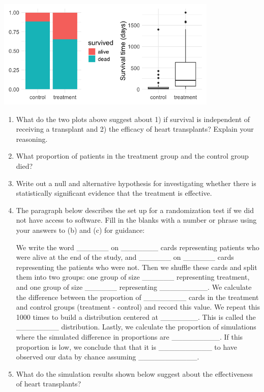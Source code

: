 \documentclass[
  letterpaper,
  DIV=11,
  numbers=noendperiod]{scrartcl}
\begin{document}
\begin{enumerate}
  \includegraphics[width=4.14583in,height=\textheight]{images/14-heart-transplant-eda.png}

  \begin{enumerate}
  \def\labelenumii{\alph{enumii}.}
  \item
    What do the two plots above suggest about 1) if survival is
    independent of receiving a transplant and 2) the efficacy of heart
    transplants? Explain your reasoning.
  \item
    What proportion of patients in the treatment group and the control
    group died?
  \item
    Write out a null and alternative hypothesis for investigating
    whether there is statistically significant evidence that the
    treatment is effective.
  \item
    The paragraph below describes the set up for a randomization test if
    we did not have access to software. Fill in the blanks with a number
    or phrase using your answers to (b) and (c) for guidance:

    We write the word \_\_\_\_\_\_ on \_\_\_\_\_\_\_ cards representing
    patients who were alive at the end of the study, and \_\_\_\_\_\_ on
    \_\_\_\_\_\_ cards representing the patients who were not. Then we
    shuffle these cards and split them into two groups: one group of
    size \_\_\_\_\_\_ representing treatment, and one group of size
    \_\_\_\_\_\_ representing \_\_\_\_\_\_\_\_\_. We calculate the
    difference between the proportion of \_\_\_\_\_\_\_\_ cards in the
    treatment and control groups (treatment - control) and record this
    value. We repeat this 1000 times to build a distribution centered at
    \_\_\_\_\_\_\_. This is called the \_\_\_\_\_\_\_\_ distribution.
    Lastly, we calculate the proportion of simulations where the
    simulated difference in proportions are \_\_\_\_\_\_\_\_\_. If this
    proportion is low, we conclude that that it is \_\_\_\_\_\_\_\_\_\_
    to have observed our data by chance assuming \_\_\_\_\_\_\_\_\_\_\_.
  \item
    What do the simulation results shown below suggest about the
    effectiveness of heart transplants?


\end{enumerate}
\end{enumerate}
\end{document}
